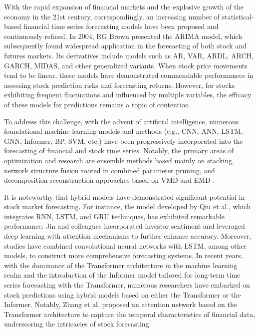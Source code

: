 \documentclass[sn-mathphys,Numbered]{sn-jnl}
\theoremstyle{thmstyleone}%
\theoremstyle{thmstyletwo}%
\theoremstyle{thmstylethree}%
\begin{document}
With the rapid expansion of financial markets and the explosive growth of the economy in the 21st century, correspondingly, an increasing number of statistical-based financial time series forecasting models have been proposed and continuously refined. In 2004, RG Brown presented the ARIMA model\cite{brown2004smoothing}, which subsequently found widespread application in the forecasting of both stock and futures markets. Its derivatives include models such as AR, VAR, ARDL, ARCH, GARCH, MIDAS, and other generalized variants\cite{wang2022asian}. When stock price movements tend to be linear, these models have demonstrated commendable performances in assessing stock prediction risks\cite{wang2020time} and forecasting returns\cite{herwartz2017stock}. However, for stocks exhibiting frequent fluctuations and influenced by multiple variables, the efficacy of these models for predictions remains a topic of contention.


To address this challenge, with the advent of artificial intelligence, numerous foundational machine learning models and methods (e.g., CNN, ANN, LSTM, GNN, Informer, BP, SVM, etc.) have been progressively incorporated into the forecasting of financial and stock time series. Notably, the primary areas of optimization and research are ensemble methods based mainly on stacking\cite{pomponi2021structured}, network structure fusion rooted in combined parameter pruning\cite{tung2018clip}\cite{yang2016integrated}, and decomposition-reconstruction approaches based on VMD and EMD\cite{alfonso2020stock}\cite{bukhari2020fractional} \cite{buyukcsahin2019improving}.



It is noteworthy that hybrid models have demonstrated significant potential in stock market forecasting. For instance, the model developed by Qiu et al., which integrates RNN, LSTM, and GRU techniques, has exhibited remarkable performance\cite{qiu2020novel}. Jin and colleagues incorporated investor sentiment and leveraged deep learning with attention mechanisms to further enhance accuracy\cite{jin2020stock}. Moreover, studies have combined convolutional neural networks with LSTM, among other models, to construct more comprehensive forecasting systems\cite{lu2021cnn}\cite{chen2022china}\cite{guo2021mrc}. In recent years, with the dominance of the Transformer architecture in the machine learning realm and the introduction of the Informer model tailored for long-term time series forecasting with the Transformer\cite{zhou2021informer}, numerous researchers have embarked on stock predictions using hybrid models based on either the Transformer or the Informer. Notably, Zhang et al. proposed an attention network based on the Transformer architecture to capture the temporal characteristics of financial data, underscoring the intricacies of stock forecasting\cite{zhang2022transformer}.
\end{document}
